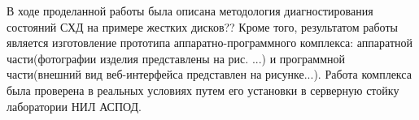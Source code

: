 \conclusion

В ходе проделанной работы была описана методология диагностирования состояний СХД на примере жестких дисков??
Кроме того, результатом работы является изготовление прототипа аппаратно-программного комплекса: аппаратной части(фотографии изделия представлены на рис. ...) и программной части(внешний вид веб-интерфейса представлен на рисунке...). Работа комплекса была проверена в реальных условиях путем его установки в серверную стойку лаборатории НИЛ АСПОД. 
